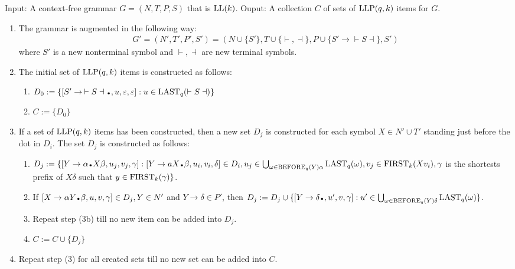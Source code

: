 \begin{algorithm}
    Input: A context-free grammar $G = (N, T, P, S)$ that is $\text{LL}(k)$. Ouput: A collection $C$ of sets of $\text{LLP}(q, k)$ items for $G$.
    \begin{enumerate}
        \item The grammar is augmented in the following way:
        \begin{align*}
            G' = (N', T', P', S') = (N \cup \{S'\}, T \cup \{\vdash, \dashv\}, P \cup \{S' \to \vdash S \dashv\}, S')
        \end{align*}
        where $S'$ is a new nonterminal symbol and $\vdash, \dashv$ are new terminal symbols.
        \item The initial set of $\text{LLP}(q, k)$ items is constructed as follows:
        \begin{enumerate}
            \item $D_0 := \{[S' \to \: \vdash S \dashv \bigdot, u, \varepsilon, \varepsilon] : u \in \LAST_q(\vdash S \dashv) \}$
            \item $C := \{D_0\}$
        \end{enumerate}
        \item If a set of $\text{LLP}(q, k)$ items has been constructed, then a new set $D_j$ is constructed
        for each symbol $X \in N' \cup T'$ standing just before the dot in $D_i$. The set $D_j$ is constructed as follows:
        \begin{enumerate}
            \item $D_j := \{[Y \to \alpha\bigdot X \beta, u_j, v_j, \gamma] : [Y \to aX\bigdot\beta, u_i, v_i, \delta] \in D_i, u_j \in \bigcup_{\omega \in \BEFORE_q(Y) \alpha} \LAST_q(\omega), v_j \in \FIRST_k(Xv_i), \gamma$ is the shortests prefix of $X\delta$ such that $y \in \text{FIRST}_k(\gamma)\}$.
            \item If $[X \to \alpha Y\bigdot \beta, u, v,\gamma] \in D_j, Y \in N'$ and $Y \to \delta \in P'$, then $D_j := D_j \cup \{[Y \to \delta \bigdot , u', v, \gamma] : u' \in \bigcup_{\omega \in \BEFORE_q(Y) \delta} \LAST_q(\omega)\}$.
            \item Repeat step (3b) till no new item can be added into $D_j$.
            \item $C := C \cup \{D_j\}$
        \end{enumerate}
        \item Repeat step (3) for all created sets till no new set can be added into $C$.
    \end{enumerate}
\end{algorithm}
